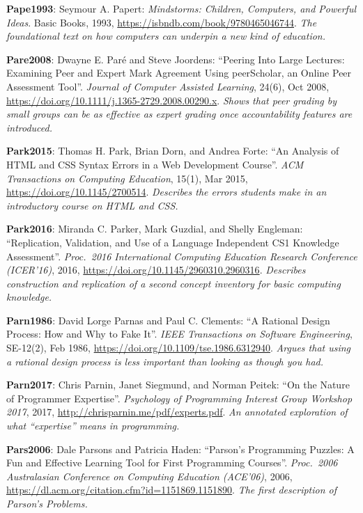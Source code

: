\textbf{\hypertarget{b:Pape1993}{Pape1993}\label{b:Pape1993}}: Seymour A. Papert: \emph{Mindstorms: Children, Computers, and Powerful Ideas}. Basic Books, 1993, \url{https://isbndb.com/book/9780465046744}. \emph{The foundational text on how computers can underpin a new kind of education.}

\textbf{\hypertarget{b:Pare2008}{Pare2008}\label{b:Pare2008}}: Dwayne E. Paré and Steve Joordens: ``Peering Into Large Lectures: Examining Peer and Expert Mark Agreement Using peerScholar, an Online Peer Assessment Tool''. \emph{Journal of Computer Assisted Learning}, 24(6), Oct 2008, \url{https://doi.org/10.1111/j.1365-2729.2008.00290.x}. \emph{Shows that peer grading by small groups can be as effective as expert grading once accountability features are introduced.}

\textbf{\hypertarget{b:Park2015}{Park2015}\label{b:Park2015}}: Thomas H. Park, Brian Dorn, and Andrea Forte: ``An Analysis of HTML and CSS Syntax Errors in a Web Development Course''. \emph{ACM Transactions on Computing Education}, 15(1), Mar 2015, \url{https://doi.org/10.1145/2700514}. \emph{Describes the errors students make in an introductory course on HTML and CSS.}

\textbf{\hypertarget{b:Park2016}{Park2016}\label{b:Park2016}}: Miranda C. Parker, Mark Guzdial, and Shelly Engleman: ``Replication, Validation, and Use of a Language Independent CS1 Knowledge Assessment''. \emph{Proc.\ 2016 International Computing Education Research Conference (ICER'16)}, 2016, \url{https://doi.org/10.1145/2960310.2960316}. \emph{Describes construction and replication of a second concept inventory for basic computing knowledge.}

\textbf{\hypertarget{b:Parn1986}{Parn1986}\label{b:Parn1986}}: David Lorge Parnas and Paul C. Clements: ``A Rational Design Process: How and Why to Fake It''. \emph{IEEE Transactions on Software Engineering}, SE-12(2), Feb 1986, \url{https://doi.org/10.1109/tse.1986.6312940}. \emph{Argues that using a rational design process is less important than looking as though you had.}

\textbf{\hypertarget{b:Parn2017}{Parn2017}\label{b:Parn2017}}: Chris Parnin, Janet Siegmund, and Norman Peitek: ``On the Nature of Programmer Expertise''. \emph{Psychology of Programming Interest Group Workshop 2017}, 2017, \url{http://chrisparnin.me/pdf/experts.pdf}. \emph{An annotated exploration of what ``expertise'' means in programming.}

\textbf{\hypertarget{b:Pars2006}{Pars2006}\label{b:Pars2006}}: Dale Parsons and Patricia Haden: ``Parson's Programming Puzzles: A Fun and Effective Learning Tool for First Programming Courses''. \emph{Proc.\ 2006 Australasian Conference on Computing Education (ACE'06)}, 2006, \url{https://dl.acm.org/citation.cfm?id=1151869.1151890}. \emph{The first description of Parson's Problems.}

